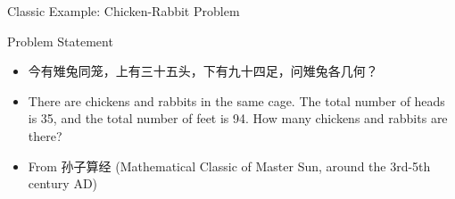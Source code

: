 \documentclass{beamer}
\begin{document}
\begin{frame}[t]{Classic Example: Chicken-Rabbit Problem}

\begin{block}{Problem Statement}
\begin{itemize}
    \item 今有雉兔同笼，上有三十五头，下有九十四足，问雉兔各几何？
    \item There are chickens and rabbits in the same cage. The total number of heads is 35, and the total number of feet is 94. How many chickens and rabbits are there?
    \item From 孙子算经 (Mathematical Classic of Master Sun, around the 3rd-5th century AD)
\end{itemize}
\end{block}


\end{frame}
\end{document}
